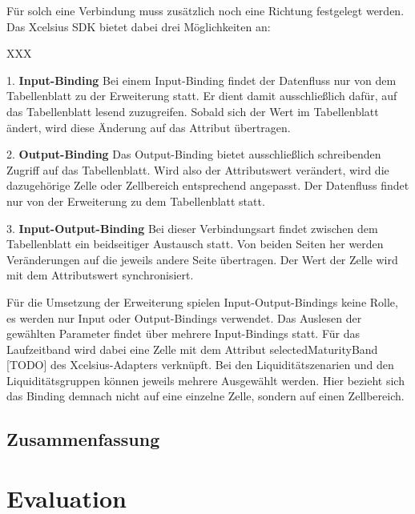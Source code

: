 Für solch eine Verbindung muss zusätzlich noch eine Richtung festgelegt werden. Das Xcelsius SDK bietet dabei drei Möglichkeiten an:

\begin{seToplist}{ XXX }

\item[1.] \textbf{Input-Binding} \newline
Bei einem Input-Binding findet der Datenfluss nur von dem Tabellenblatt zu der Erweiterung statt. Er dient damit ausschließlich dafür, auf das Tabellenblatt lesend zuzugreifen. Sobald sich der Wert im Tabellenblatt ändert, wird diese Änderung auf das Attribut übertragen.

\item[2.] \textbf{Output-Binding} \newline
Das Output-Binding bietet ausschließlich schreibenden Zugriff auf das Tabellenblatt. Wird also der Attributswert verändert, wird die dazugehörige Zelle oder Zellbereich entsprechend angepasst. Der Datenfluss findet nur von der Erweiterung zu dem Tabellenblatt statt.

\item[3.] \textbf{Input-Output-Binding} \newline
Bei dieser Verbindungsart findet zwischen dem Tabellenblatt ein beidseitiger Austausch statt. Von beiden Seiten her werden Veränderungen auf die jeweils andere Seite übertragen. Der Wert der Zelle wird mit dem Attributswert synchronisiert.

\end{seToplist}

Für die Umsetzung der Erweiterung spielen Input-Output-Bindings keine Rolle, es werden nur Input oder Output-Bindings verwendet. Das Auslesen der gewählten Parameter findet über mehrere Input-Bindings statt. Für das Laufzeitband wird dabei eine Zelle mit dem Attribut selectedMaturityBand [TODO] des Xcelsius-Adapters verknüpft. Bei den Liquiditätszenarien und den Liquiditätsgruppen können jeweils mehrere Ausgewählt werden. Hier bezieht sich das Binding demnach nicht auf eine einzelne Zelle, sondern auf einen Zellbereich.


\section{Zusammenfassung}

\chapter{Evaluation}

